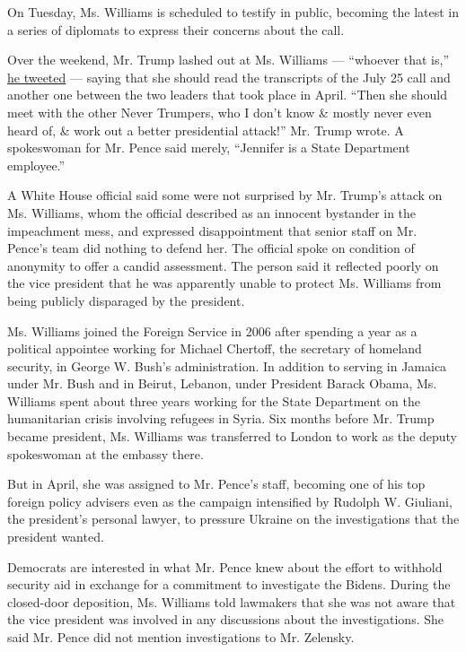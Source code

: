 On Tuesday, Ms. Williams is scheduled to testify in public, becoming the
latest in a series of diplomats to express their concerns about the
call.

Over the weekend, Mr. Trump lashed out at Ms. Williams --- ``whoever
that is,''
\href{https://twitter.com/realDonaldTrump/status/1196155347117002752?s=20}{he
tweeted} --- saying that she should read the transcripts of the July 25
call and another one between the two leaders that took place in April.
``Then she should meet with the other Never Trumpers, who I don't know
\& mostly never even heard of, \& work out a better presidential
attack!'' Mr. Trump wrote. A spokeswoman for Mr. Pence said merely,
``Jennifer is a State Department employee.''

A White House official said some were not surprised by Mr. Trump's
attack on Ms. Williams, whom the official described as an innocent
bystander in the impeachment mess, and expressed disappointment that
senior staff on Mr. Pence's team did nothing to defend her. The official
spoke on condition of anonymity to offer a candid assessment. The person
said it reflected poorly on the vice president that he was apparently
unable to protect Ms. Williams from being publicly disparaged by the
president.

Ms. Williams joined the Foreign Service in 2006 after spending a year as
a political appointee working for Michael Chertoff, the secretary of
homeland security, in George W. Bush's administration. In addition to
serving in Jamaica under Mr. Bush and in Beirut, Lebanon, under
President Barack Obama, Ms. Williams spent about three years working for
the State Department on the humanitarian crisis involving refugees in
Syria. Six months before Mr. Trump became president, Ms. Williams was
transferred to London to work as the deputy spokeswoman at the embassy
there.

But in April, she was assigned to Mr. Pence's staff, becoming one of his
top foreign policy advisers even as the campaign intensified by Rudolph
W. Giuliani, the president's personal lawyer, to pressure Ukraine on the
investigations that the president wanted.

Democrats are interested in what Mr. Pence knew about the effort to
withhold security aid in exchange for a commitment to investigate the
Bidens. During the closed-door deposition, Ms. Williams told lawmakers
that she was not aware that the vice president was involved in any
discussions about the investigations. She said Mr. Pence did not mention
investigations to Mr. Zelensky.

